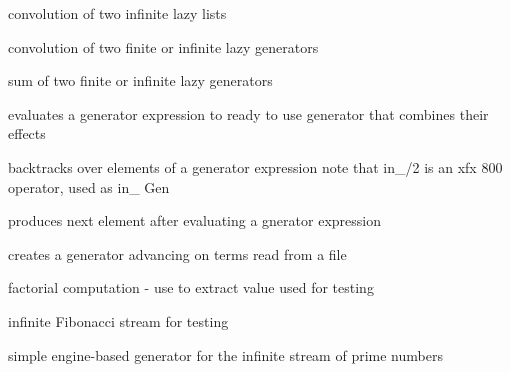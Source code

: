 \documentclass[11pt]{article}
\begin{document}
\begin{description}
convolution of two infinite lazy lists

convolution of two finite or infinite lazy generators

sum of two finite or infinite lazy generators

evaluates a generator expression to ready to use
generator that combines their effects

backtracks over elements of a generator expression
note that in_/2 is an xfx 800 operator, used as  in_ Gen

produces next element after evaluating a gnerator expression

creates a generator advancing on terms read from a file

factorial computation - use  to extract value
used for testing

infinite Fibonacci stream for testing

simple engine-based generator for the infinite stream of prime numbers
\end{description}


\printindex
\end{document}

